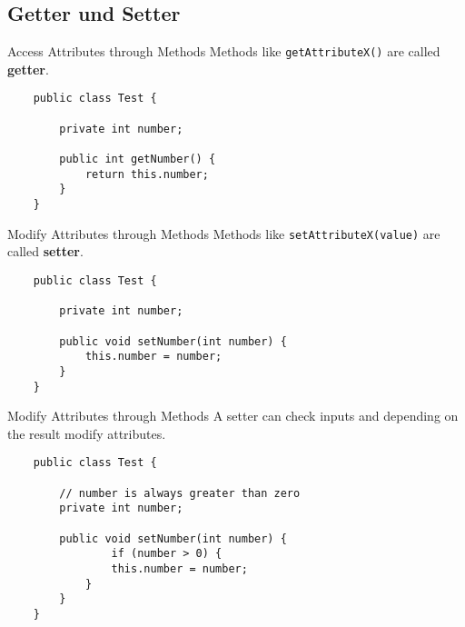 \subsection{Getter und Setter}
\begin{frame}[fragile]{Access Attributes through Methods}
	Methods like \texttt{getAttributeX()} are called \textbf{getter}.
	\begin{lstlisting}
	public class Test {
	
	    private int number;
	    
	    public int getNumber() {
	        return this.number;
	    }
	}
	\end{lstlisting}
\end{frame}

\begin{frame}[fragile]{Modify Attributes through Methods}
	Methods like \texttt{setAttributeX(value)} are called \textbf{setter}.
	\begin{lstlisting}
	public class Test {
	
	    private int number;
	    
	    public void setNumber(int number) {
	        this.number = number;
	    }
	}
	\end{lstlisting}
\end{frame}

\begin{frame}[fragile]{Modify Attributes through Methods}
	A setter can check inputs and depending on the result modify attributes.
	\begin{lstlisting}
	public class Test {
	
	    // number is always greater than zero
	    private int number;
	    
	    public void setNumber(int number) {
	    	    if (number > 0) {
	            this.number = number;
	        }
	    }
	}
	\end{lstlisting}
\end{frame}

